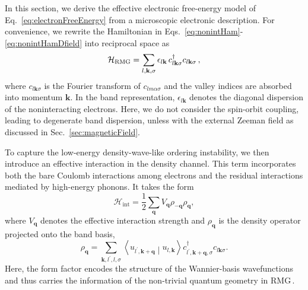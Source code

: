 \documentclass[aps,prx,article,twocolumn,amsmath,amssymb,superscriptaddress,longbibliography]{revtex4-2}
\begin{document}
In this section, we derive the effective electronic free-energy model  of Eq.~\eqref{eq:electronFreeEnergy} from a microscopic electronic description. For convenience, we rewrite the Hamiltonian in Eqs.~\eqref{eq:nonintHam}-\eqref{eq:nonintHamDfield} into reciprocal space as
\begin{equation}
\mathcal{H}_{\rm RMG}=\sum_{ l,\mathbf{k},\sigma}\epsilon_{l\mathbf{k}}\,c^\dagger_{l\mathbf{k}\sigma}c_{l\mathbf{k}\sigma}\,,
\end{equation}
where $c_{l\mathbf{k}\sigma}$ is the Fourier transform of $c_{lm\alpha \sigma}$ and the valley indices are absorbed into momentum $\mathbf{k}$. In the band representation, $\epsilon_{l\mathbf{k}}$ denotes the diagonal dispersion of the noninteracting electrons. Here, we do not consider the spin-orbit coupling, leading to degenerate band dispersion, unless with the external Zeeman field as discussed in Sec.~\ref{sec:magneticField}.

To capture the low-energy density-wave-like ordering instability, we then introduce an effective interaction in the density channel. This term incorporates both the bare Coulomb interactions among electrons and the residual interactions mediated by high-energy phonons. It takes the form
\begin{equation}\label{eq:appInteraction}
\mathcal{H}_{\mathrm{int}}=\frac12\sum_{\mathbf q}V_{\mathbf q}\rho_{-\mathbf q}\rho_{\mathbf q},
\end{equation}
where $V_{\mathbf q}$ denotes the effective interaction strength and $\rho_{\mathbf q}$ is the density operator projected onto the band basis,
\begin{equation}
\rho_{\mathbf q}=\sum_{\mathbf k,l^\prime,l,\sigma}\left\langle u_{l^\prime,\mathbf k+\mathbf q}\middle|u_{l,\mathbf k}\right\rangle c^\dagger_{l^\prime,\mathbf{k+q},\sigma} c_{l\mathbf{k}\sigma}.
\end{equation}
Here, the form factor encodes the structure of the Wannier-basis wavefunctions and thus carries the information of the non-trivial quantum geometry in RMG\,\cite{parramartinez2025band, jahin2026enhanced}.
\end{document}
